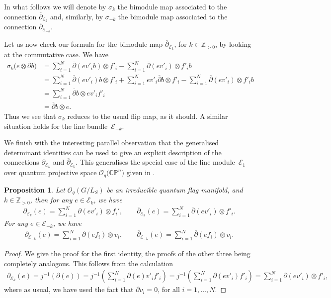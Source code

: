 \documentclass[pdftex]{sigma}
\numberwithin{equation}{section}
\newtheorem{prop}[Theorem]{Proposition}
 { \theoremstyle{definition}
\newtheorem{defn}[Theorem]{Definition}
\newtheorem{Note}[Theorem]{Note}
\newtheorem{eg}[Theorem]{Example}
\newtheorem{Remark}[Theorem]{Remark} }
\newcommand\del{\partial}
\newcommand\adel{\overline{\partial}}
\begin{document}
In what follows we will denote by $\sigma_k$ the bimodule map associated to the connection $\overline{\partial}_{\mathcal{E}_k}$ and, similarly, by $\sigma_{-k}$ the bimodule map associated to the connection $\adel_{\mathcal{E}_{-k}}$.

\begin{eg}
Let us now check our formula for the bimodule map $\adel_{\mathcal{E}_k}$, for $k \in \mathbb{Z}_{>0}$, by looking at the commutative case. We have
\begin{align*}
\sigma_k\big(e \otimes \adel b\big) &= \sum_{i=1}^{N} \adel(ev'_ib) \otimes f'_i - \sum_{i=1}^{N} \adel(ev'_i) \otimes f'_ib \\
&= \sum_{i=1}^{N} \adel(ev'_i)b \otimes f'_i + \sum_{i=1}^{N} ev'_i\adel b \otimes f'_i - \sum_{i=1}^{N} \adel(ev'_i) \otimes f'_ib \\
&= \sum_{i=1}^{N} \adel b \otimes ev'_if'_i \\
&= \adel b \otimes e.
\end{align*}
Thus we see that $\sigma_k$ reduces to the usual flip map, as it should. A similar situation holds for the line bundle~$\mathcal{E}_{-k}$.
\end{eg}

We finish with the interesting parallel observation that the generalised determinant identities can be used to give an explicit description of the connections $\del_{\mathcal{E}_k}$ and $\adel_{\mathcal{E}_k}$. This generalises the special case of the line module~$\mathcal{E}_1$ over quantum projective space $\mathcal{O}_q\big(\mathbb{CP}^{n}\big)$ given in \cite[Example~8.5]{MMF1}.

\begin{prop}Let $\mathcal{O}_q(G/L_S)$ be an irreducible quantum flag manifold, and $k \in \mathbb{Z}_{>0}$, then for any $e \in \mathcal{E}_k$, we have
\begin{gather*}%
\del_{\mathcal{E}_k}(e) = \sum_{i=1}^N \del(ev'_i) \otimes f_i', \qquad \adel_{\mathcal{E}_{k}}(e) = \sum_{i=1}^N \adel(ev'_i) \otimes f'_i.
\end{gather*}
 For any $e \in \mathcal{E}_{-k}$, we have
\begin{gather}\label{eqn:exadelbar}
\del_{\mathcal{E}_{-k}}(e) = \sum_{i=1}^N \del(ef_i) \otimes v_i, \qquad \adel_{\mathcal{E}_{-k}}(e) = \sum_{i=1}^N \adel(ef_i) \otimes v_i.
\end{gather}
\end{prop}
\begin{proof}We give the proof for the first identity, the proofs of the other three being completely analogous. This follows from the calculation
\begin{gather*}
\del_{\mathcal{E}_k}(e) = j^{-1}(\del(e)) = j^{-1}\left(\sum_{i=1}^N \del(e)v'_if'_i\right) = j^{-1}\left(\sum_{i=1}^N \del(ev'_i)f'_i\right) = \sum_{i=1}^N \del(ev'_i) \otimes f'_i,
\end{gather*}
where as usual, we have used the fact that $\del v_i = 0$, for all $i=1, \dots, N$.
\end{proof}
\end{document}
